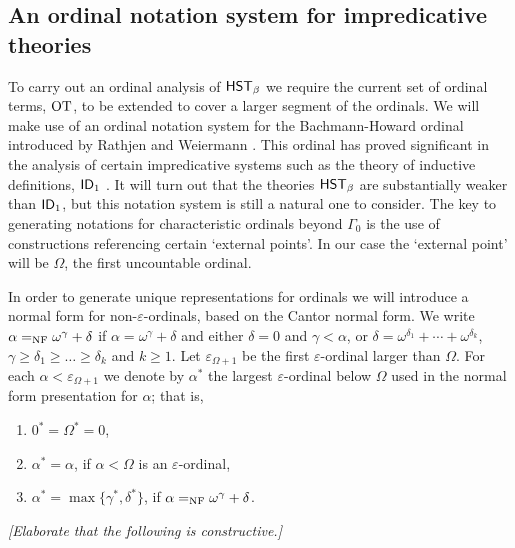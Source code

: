 \documentclass[UKenglish,cleveref,DIV=12]{scrartcl}
\theoremstyle{definition}
\theoremstyle{definition}
\begin{document}
\subsection{An ordinal notation system for impredicative theories} \label{extsec:moreordinals}
To carry out an ordinal analysis of $\mathsf{HST}_\beta$ we require the current
set of ordinal terms, $\mathrm{OT}$, to be extended to cover a larger segment of the
ordinals. We will make use of an ordinal notation system for the Bachmann-Howard
ordinal introduced by Rathjen and Weiermann \cite{RW93}. This
ordinal has proved significant in
the analysis of certain impredicative systems such as the theory of inductive
definitions, $\mathsf{ID}_1$ \cite{BFPS81}. It will turn out that the theories $\mathsf{HST}_\beta$ are
substantially weaker than $\mathsf{ID}_1$, but this notation system is still a
natural one to consider. The key to generating notations for characteristic
ordinals beyond $\Gamma_0$ is the use of constructions referencing certain
`external points'. In our case the `external point' will be $\Omega$, the first
uncountable ordinal.

In order to generate unique representations for ordinals we will introduce a
normal form for non-$\varepsilon$-ordinals, based on the Cantor normal form.
We write $\alpha=_{\mathrm{NF}}\omega^\gamma+\delta$ if $\alpha=\omega^\gamma+\delta$ and either $\delta=0$ and
$\gamma<\alpha$, or $\delta=\omega^{\delta_1}+\cdots+\omega^{\delta_k}$,
$\gamma\ge\delta_1\ge\ldots\ge\delta_k$ and $k\ge1$. Let $\varepsilon_{\Omega+1}$
be the first $\varepsilon$-ordinal larger than $\Omega$. For each
$\alpha<\varepsilon_{\Omega+1}$ we denote by $\alpha^*$ the largest $\varepsilon$-ordinal
below $\Omega$ used in the normal form presentation for $\alpha$; that
is,
\begin{enumerate}
 \item $0^*=\Omega^*=0$,
 \item $\alpha^*=\alpha$, if $\alpha<\Omega$ is an $\varepsilon$-ordinal,
 \item $\alpha^*=\max\{\gamma^*,\delta^*\}$, if $\alpha=_{\mathrm{NF}}\omega^\gamma+\delta$.
\end{enumerate}

\emph{[Elaborate that the following is constructive.]}
\end{document}
